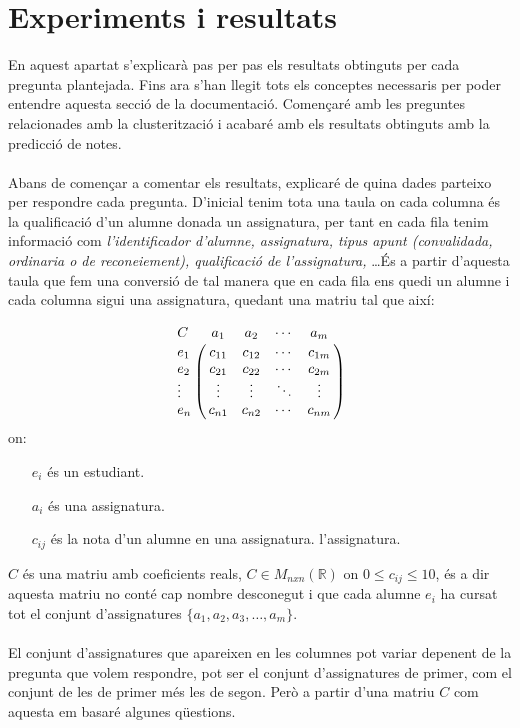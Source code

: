 \documentclass[12pt,a4paper,catalan]{article}
\begin{document}
\newpage

\section{Experiments i resultats}
En aquest apartat s'explicarà pas per pas els resultats obtinguts per cada pregunta plantejada. Fins ara s'han llegit tots els conceptes necessaris per poder entendre aquesta secció de la documentació. Començaré amb les preguntes relacionades amb la clusterització i acabaré amb els resultats obtinguts amb la predicció de notes.
\\
\\

Abans de començar a comentar els resultats, explicaré de quina dades parteixo per respondre cada pregunta. D'inicial tenim tota una taula on cada columna és la qualificació d'un alumne donada un assignatura, per tant en cada fila tenim informació com \textit{l'identificador d'alumne, assignatura, tipus apunt (convalidada, ordinaria o de reconeiement), qualificació de l'assignatura,} \ldots És a partir d'aquesta taula que fem una conversió de tal manera que en cada fila ens quedi un alumne i cada columna sigui una assignatura, quedant una matriu tal que així:

$$
\bordermatrix{C &         a_1   &    a_2   &   \cdots    &    a_m  \cr
                  e_1    &  c_{11}  &  c_{12}  &   \cdots    &  c_{1m} \cr
                  e_2    &  c_{21}  &  c_{22}  &   \cdots    &  c_{2m}    \cr
                  \vdots &  \vdots  &  \vdots  &   \ddots    &  \vdots \cr
                  e_n    &  c_{n1}  &  c_{n2}  &   \cdots    &  c_{nm} \cr
                  }
$$
on:
\begin{itemize}[leftmargin=.5in]
	\item [$e_i$] és un estudiant.
	\item [$a_i$] és una assignatura.
	\item [$c_{ij}$] és la nota d'un alumne en una assignatura. l'assignatura.
\end{itemize}


$C$ és una matriu amb coeficients reals, $C\in M_{nxn} (\mathbb{R})$ on $0 \leq c_{ij} \leq 10$, és a dir aquesta matriu no conté cap nombre desconegut i que cada alumne $e_i$ ha cursat tot el conjunt d'assignatures $\{a_1, a_2, a_3, \ldots, a_m\}$.
\\
\\
El conjunt d'assignatures que apareixen en les columnes pot variar depenent de la pregunta que volem respondre, pot ser el conjunt d'assignatures de primer, com el conjunt de les de primer més les de segon. Però a partir d'una matriu $C$ com aquesta em basaré algunes qüestions.
\end{document}
